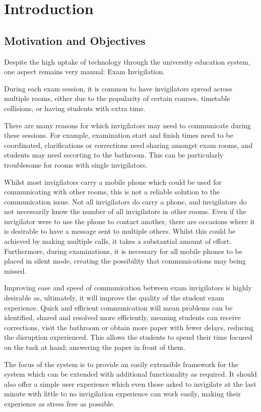 
\chapter{Introduction}

\section{Motivation and Objectives}

Despite the high uptake of technology through the university education system, one aspect remains very manual: Exam Invigilation.

During each exam session, it is common to have invigilators spread across multiple rooms, either due to the popularity of certain courses, timetable collisions, or having students with extra time.

There are many reasons for which invigilators may need to communicate during these sessions.  For example, examination start and finish times need to be coordinated, clarifications or corrections need sharing amongst exam rooms, and students may need escorting to the bathroom.  This can be particularly troublesome for rooms with single invigilators.

Whilst most invigilators carry a mobile phone which could be used for communicating with other rooms, this is not a reliable solution to the communication issue.  Not all invigilators do carry a phone, and invigilators do not necessarily know the number of all invigilators in other rooms.  Even if the invigilator were to use the phone to contact another, there are occasions where it is desirable to have a message sent to multiple others.  Whilst this could be achieved by making multiple calls, it takes a substantial amount of effort.  Furthermore, during examinations, it is necessary for all mobile phones to be placed in silent mode, creating the possibility that communications may being missed.

Improving ease and speed of communication between exam invigilators is highly desirable as, ultimately, it will improve the quality of the student exam experience.  Quick and efficient communication will mean problems can be identified, shared and resolved more efficiently, meaning students can receive corrections, visit the bathroom or obtain more paper with fewer delays, reducing the disruption experienced.  This allows the students to spend their time focused on the task at hand; answering the paper in front of them.

The focus of the system is to provide an easily extensible framework for the system which can be extended with additional functionality as required. It should also offer a simple user experience which even those asked to invigilate at the last minute with little to no invigilation experience can work easily, making their experience as stress free as possible.
